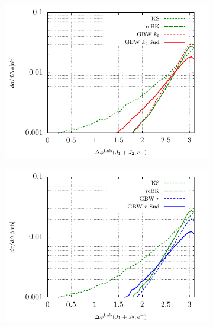 \documentclass[11pt]{article}
\begin{document}
\begin{figure}[p]
	\begin{subfigure}{0.5\textwidth}
		\includegraphics[width=\textwidth]{plots/plotGBW2Lab}
	\end{subfigure}
	\begin{subfigure}{0.5\textwidth}
		\includegraphics[width=\textwidth]{plots/plotGBW3Lab}
	\end{subfigure}


\end{figure}
\end{document}
